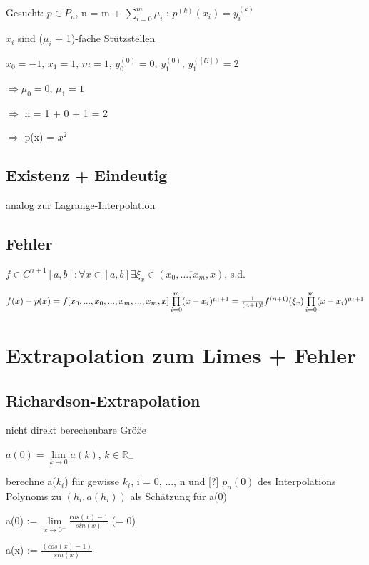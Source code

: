 \documentclass[12pt,a4paper]{article} %
\newcommand*\tab[1][1cm]{\hspace*{#1}}
\begin{document}
	Gesucht: $p \in P_n$, n = m + $\sum\limits_{i = 0}^{m}\mu_i$ : $p^{(k)}(x_i) = y_i^{(k)}$
	
	$x_i$ sind ($\mu_i$ + 1)-fache Stützstellen
	
	$x_0 = -1$, $x_1 = 1$, $m = 1$, $y_0^{(0)} = 0$, $y_1^{(0)}$, $y_1^{([l?])} = 2$
	
	$\Rightarrow \mu_0 = 0$, $\mu_1 = 1$
	
	$\Rightarrow$ n = 1 + 0 + 1 = 2
	
	$\Rightarrow$ p(x) = $x^2$
	
	\subsection{Existenz + Eindeutig}
	
	analog zur Lagrange-Interpolation
	
	\subsection{Fehler}
	
	$f \in C^{n + 1}[a, b]: \forall x \in [a, b] \exists \xi_x \in (\overline{x_0, ..., x_m, x})$, s.d.
	
	$f(x) - p(x) = f[x_0, ..., x_0, ..., x_m, ..., x_m, x]\prod\limits_{i = 0}^{m}(x - x_i)^{\mu_i + 1} \\
	 = \frac{1}{(n + 1)!}f^{(n + 1)}(\xi_x)\prod\limits_{i = 0}^{m}(x - x_i)^{\mu_i + 1}$
	
	\newpage
	
	\section[Extrapolation]{Extrapolation zum Limes + Fehler}
	
	\subsection{Richardson-Extrapolation}
	
	nicht direkt berechenbare Größe
	
	$a(0) = \lim\limits_{k\rightarrow 0}a(k)$, \tab $k \in \mathbb{R}_+$
	
	berechne a($k_i$) für gewisse $k_i$, i = 0, ..., n und [?] $p_n(0)$ des Interpolations Polynoms zu $(h_i, a(h_i))$ als Schätzung für a(0)
	
	a(0) := $\lim\limits_{x\rightarrow 0^+} \frac{cos(x) - 1}{sin(x)}$ \tab (= 0)
	
	a(x) := $\frac{(cos(x) - 1)}{sin(x)}$
	
\end{document}
